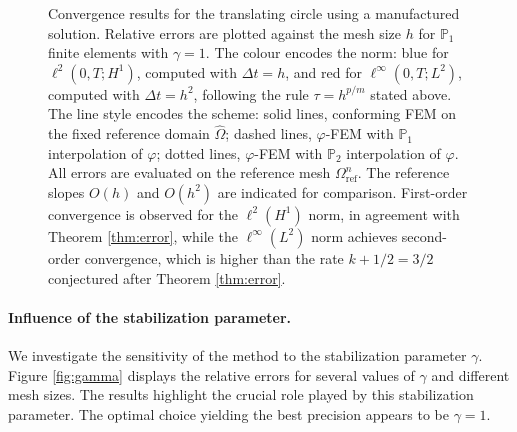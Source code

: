 \documentclass[11pt,a4paper]{article}
\theoremstyle{plain}
\theoremstyle{definition}
\theoremstyle{remark}
\numberwithin{equation}{section}
\begin{document}
\begin{figure}[h]
    \caption{Convergence results for the translating circle using a manufactured solution. Relative errors are plotted against the mesh size $h$ for $\mathbb{P}_1$ finite elements with $\gamma=1$. The colour encodes the norm: blue for $\ell^2(0,T;H^1)$, computed with $\Delta t = h$, and red for $\ell^\infty(0,T;L^2)$, computed with $\Delta t = h^2$, following the rule $\tau=h^{p/m}$ stated above. The line style encodes the scheme: solid lines, conforming FEM on the fixed reference domain $\hat\Omega$; dashed lines, $\varphi$-FEM with $\mathbb{P}_1$ interpolation of $\varphi$; dotted lines, $\varphi$-FEM with $\mathbb{P}_2$ interpolation of $\varphi$. All errors are evaluated on the reference mesh $\Omega_\mathrm{ref}^n$. The reference slopes $O(h)$ and $O(h^2)$ are indicated for comparison. First-order convergence is observed for the $\ell^2(H^1)$ norm, in agreement with Theorem \ref{thm:error}, while the $\ell^\infty(L^2)$ norm achieves second-order convergence, which is higher than the rate $k+1/2=3/2$ conjectured after Theorem \ref{thm:error}.}
    \label{fig:convergence1}
\end{figure}


\paragraph{Influence of the stabilization parameter.} We investigate the sensitivity of the method to the stabilization parameter $\gamma$. Figure \ref{fig:gamma} displays the relative errors for several values of $\gamma$ and different mesh sizes. The results highlight the crucial role played by this stabilization parameter. The optimal choice yielding  the best precision appears to be $\gamma = 1$.
\end{document}
